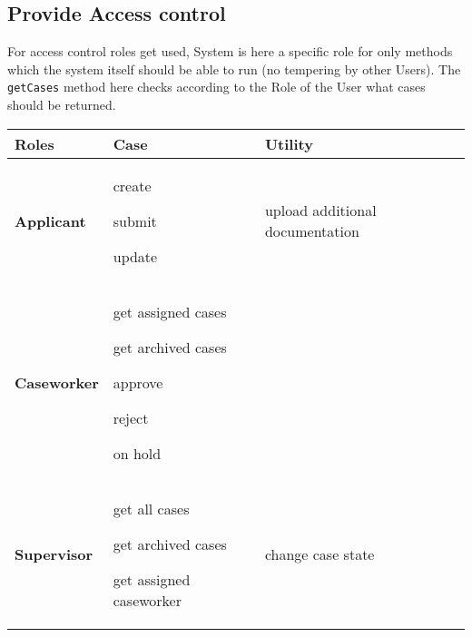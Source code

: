 \newpage
\subsection{Provide Access control}


For access control roles get used, System is here a specific role for only methods which the system itself should be able to run (no tempering by other Users).
The \texttt{getCases} method here checks according to the Role of the User what cases should be returned.

\begin{table}[htb!]
\begin{tabularx}{\textwidth}{l|X|X}
	\textbf{Roles} & \textbf{Case} & \textbf{Utility} \\
	\hline
	\textbf{Applicant} & 
	\begin{compactitem}
	    \item create
	    \item submit
	    \item update
	\end{compactitem} & upload additional documentation \\
	\hline
	\textbf{Caseworker} & 
	\begin{compactitem} 
	    \item get assigned cases
	    \item get archived cases
	    \item approve
	    \item reject
	    \item on hold
	\end{compactitem} & \\
	\hline
	\textbf{Supervisor} &
	\begin{compactitem}
	    \item get all cases
	    \item get archived cases
	    \item get assigned caseworker
	\end{compactitem} &
	\begin{compactitem}
	    \item change case state
	\end{compactitem} \\
\end{tabularx}
\end{table}